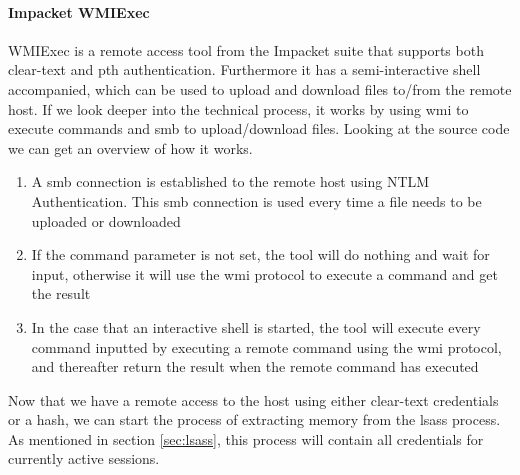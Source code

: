 \documentclass{article}
\begin{document}
\paragraph{Impacket WMIExec} WMIExec is a remote access tool from the Impacket suite that supports both clear-text and \gls{pth} authentication. Furthermore it has a semi-interactive shell accompanied, which can be used to upload and download files to/from the remote host. If we look deeper into the technical process, it works by using \gls{wmi} to execute commands and \gls{smb} to upload/download files. Looking at the source code\cite{url:impacket:wmiexec} we can get an overview of how it works.

\begin{enumerate}
    \item A \gls{smb} connection is established to the remote host using NTLM Authentication. This \gls{smb} connection is used every time a file needs to be uploaded or downloaded
    \item If the command parameter is not set, the tool will do nothing and wait for input, otherwise it will use the \gls{wmi} protocol to execute a command and get the result
    \item In the case that an interactive shell is started, the tool will execute every command inputted by executing a remote command using the \gls{wmi} protocol, and thereafter return the result when the remote command has executed
\end{enumerate}

Now that we have a remote access to the host using either clear-text credentials or a hash, we can start the process of extracting memory from the \gls{lsass} process. As mentioned in section \ref{sec:lsass}, this process will contain all credentials for currently active sessions.
\end{document}

